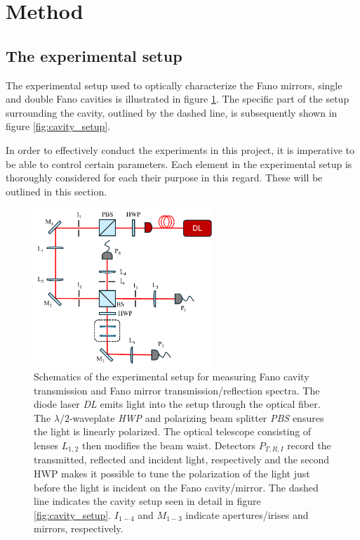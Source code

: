 \section{Method}
\subsection{The experimental setup}\label{sec:experimental_setup}

The experimental setup used to optically characterize the Fano mirrors, single and double Fano cavities is illustrated in figure \ref{fig:setup_sketch}. The specific part of the setup surrounding the cavity, outlined by the dashed line, is subsequently shown in figure \ref{fig:cavity_setup}. 

In order to effectively conduct the experiments in this project, it is imperative to be able to control certain parameters. Each element in the experimental setup is thoroughly considered for each their purpose in this regard. These will be outlined in this section. 

\begin{figure}[h!]
    \centering
    \includegraphics[width=0.6\textwidth]{figures/setup_sketch.pdf}
    \caption{Schematics of the experimental setup for measuring Fano cavity transmission and Fano mirror transmission/reflection spectra. The diode laser \emph{DL} emits light into the setup through the optical fiber. The $\lambda/2$-waveplate \emph{HWP} and polarizing beam splitter \emph{PBS} ensures the light is linearly polarized. The optical telescope consisting of lenses $L_{1,2}$ then modifies the beam waist. Detectors $P_{T,R,I}$ record the transmitted, reflected and incident light, respectively and the second HWP makes it possible to tune the polarization of the light just before the light is incident on the Fano cavity/mirror. The dashed line indicates the cavity setup seen in detail in figure \ref{fig:cavity_setup}. $I_{1-4}$ and $M_{1-3}$ indicate apertures/irises and mirrors, respectively.}
    \label{fig:setup_sketch}
\end{figure}

